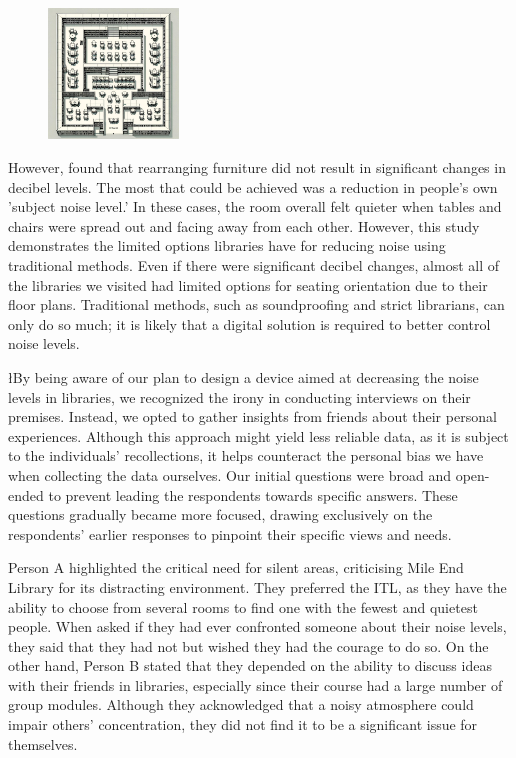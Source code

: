 \documentclass{novel}
\begin{document}
\begin{figure} 
\vspace{-\intextsep}
    \includegraphics[width=0.31\textwidth]{resources/chairs.jpg}
    \vspace{-20pt} %
\end{figure}
However, \cite{luyben_reducing_1981} found that rearranging furniture did not result in significant changes in decibel levels. The most that could be achieved was a reduction in people's own 'subject noise level.' In these cases, the room overall felt quieter when tables and chairs were spread out and facing away from each other. However, this study demonstrates the limited options libraries have for reducing noise using traditional methods. Even if there were significant decibel changes, almost all of the libraries we visited had limited options for seating orientation due to their floor plans. Traditional methods, such as soundproofing and strict librarians, can only do so much; it is likely that a digital solution is required to better control noise levels.

\l{B}y being aware of our plan to design a device aimed at decreasing the noise levels in libraries, we recognized the irony in conducting interviews on their premises. Instead, we opted to gather insights from friends about their personal experiences. Although this approach might yield less reliable data, as it is subject to the individuals' recollections, it helps counteract the personal bias we have when collecting the data ourselves. Our initial questions were broad and open-ended to prevent leading the respondents towards specific answers. These questions gradually became more focused, drawing exclusively on the respondents’ earlier responses to pinpoint their specific views and needs.

Person A highlighted the critical need for silent areas, criticising Mile End Library for its distracting environment. They preferred the ITL, as they have the ability to choose from several rooms to find one with the fewest and quietest people. When asked if they had ever confronted someone about their noise levels, they said that they had not but wished they had the courage to do so. On the other hand, Person B stated that they depended on the ability to discuss ideas with their friends in libraries, especially since their course had a large number of group modules. Although they acknowledged that a noisy atmosphere could impair others' concentration, they did not find it to be a significant issue for themselves.
\end{document}

